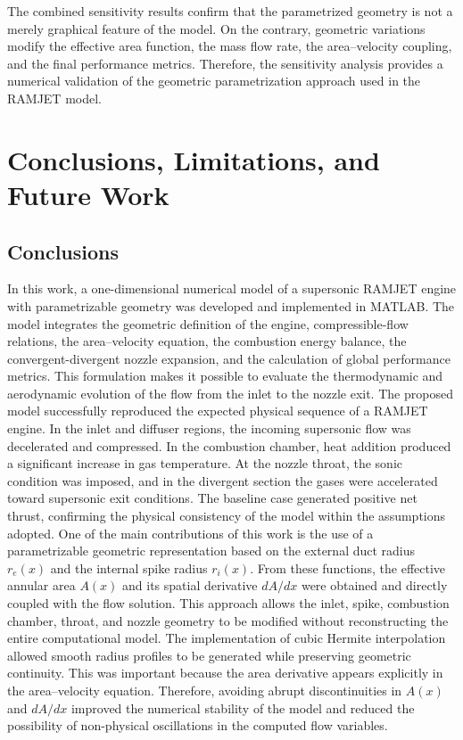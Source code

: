 \documentclass[preprint,12pt]{elsarticle}
\begin{document}
The combined sensitivity results confirm that the parametrized geometry is not a merely graphical feature of the model. On the contrary, geometric variations modify the effective area function, the mass flow rate, the area--velocity coupling, and the final performance metrics. Therefore, the sensitivity analysis provides a numerical validation of the geometric parametrization approach used in the RAMJET model.
\section{Conclusions, Limitations, and Future Work}
\label{sec:conclusions}
\subsection{Conclusions}
In this work, a one-dimensional numerical model of a supersonic RAMJET engine with parametrizable geometry was developed and implemented in MATLAB. The model integrates the geometric definition of the engine, compressible-flow relations, the area--velocity equation, the combustion energy balance, the convergent-divergent nozzle expansion, and the calculation of global performance metrics. This formulation makes it possible to evaluate the thermodynamic and aerodynamic evolution of the flow from the inlet to the nozzle exit.
The proposed model successfully reproduced the expected physical sequence of a RAMJET engine. In the inlet and diffuser regions, the incoming supersonic flow was decelerated and compressed. In the combustion chamber, heat addition produced a significant increase in gas temperature. At the nozzle throat, the sonic condition was imposed, and in the divergent section the gases were accelerated toward supersonic exit conditions. The baseline case generated positive net thrust, confirming the physical consistency of the model within the assumptions adopted.
One of the main contributions of this work is the use of a parametrizable geometric representation based on the external duct radius $r_e(x)$ and the internal spike radius $r_i(x)$. From these functions, the effective annular area $A(x)$ and its spatial derivative $dA/dx$ were obtained and directly coupled with the flow solution. This approach allows the inlet, spike, combustion chamber, throat, and nozzle geometry to be modified without reconstructing the entire computational model.
The implementation of cubic Hermite interpolation allowed smooth radius profiles to be generated while preserving geometric continuity. This was important because the area derivative appears explicitly in the area--velocity equation. Therefore, avoiding abrupt discontinuities in $A(x)$ and $dA/dx$ improved the numerical stability of the model and reduced the possibility of non-physical oscillations in the computed flow variables.
\end{document}
